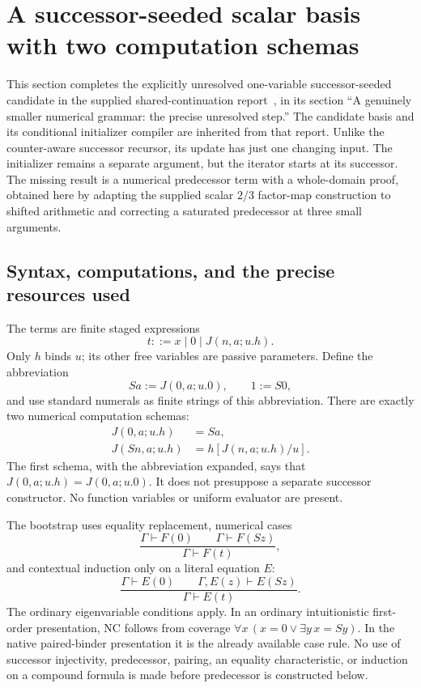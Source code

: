 
\section{A successor-seeded scalar basis with two computation schemas}
\label{js:section}

This section completes the explicitly unresolved one-variable
successor-seeded candidate in the supplied shared-continuation
report~\cite{shared}, in its section ``A genuinely smaller numerical
grammar: the precise unresolved step.''  The candidate basis and its
conditional initializer compiler are inherited from that report.
Unlike the counter-aware successor recursor, its update has just one
changing input.  The initializer remains a separate argument, but the
iterator starts at its successor.  The missing result is a numerical
predecessor term with a whole-domain proof, obtained here by adapting
the supplied scalar $2/3$ factor-map construction to shifted arithmetic
and correcting a saturated predecessor at three small arguments.

\subsection{Syntax, computations, and the precise resources used}

The terms are finite staged expressions
\[
 t ::= x\mid 0\mid J(n,a;u.h).
\]
Only $h$ binds $u$; its other free variables are passive parameters.
Define the abbreviation
\[
 Sa:=J(0,a;u.0),\qquad 1:=S0,
\]
and use standard numerals as finite strings of this abbreviation.
There are exactly two numerical computation schemas:
\begin{align}
 J(0,a;u.h)&=Sa,\tag{J0}\label{js:j0}\\
 J(Sn,a;u.h)&=h[J(n,a;u.h)/u].\tag{JS}\label{js:js}
\end{align}
The first schema, with the abbreviation expanded, says that
$J(0,a;u.h)=J(0,a;u.0)$.  It does not presuppose a separate successor
constructor.  No function variables or uniform evaluator are present.

The bootstrap uses equality replacement, numerical cases
\[
 \frac{\Gamma\vdash F(0)\qquad\Gamma\vdash F(Sz)}
      {\Gamma\vdash F(t)},
 \tag{NC}\label{js:nc}
\]
and contextual induction only on a literal equation $E$:
\[
 \frac{\Gamma\vdash E(0)\qquad\Gamma,E(z)\vdash E(Sz)}
      {\Gamma\vdash E(t)}.
 \tag{EI}\label{js:ei}
\]
The ordinary eigenvariable conditions apply.  In an ordinary
intuitionistic first-order presentation, NC follows from coverage
$\forall x\,(x=0\vee\exists y\,x=Sy)$.  In the native paired-binder
presentation it is the already available case rule.  No use of
successor injectivity, predecessor, pairing, an equality characteristic,
or induction on a compound formula is made before predecessor is
constructed below.

